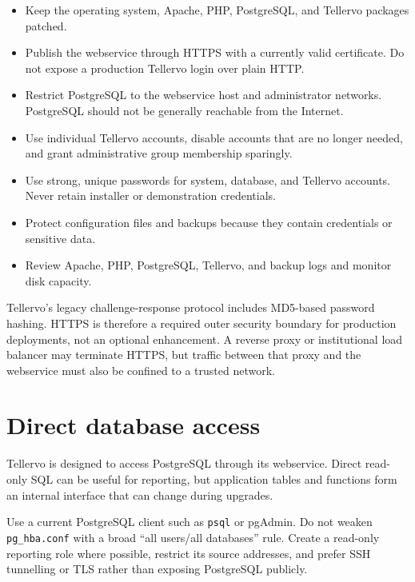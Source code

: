 \begin{itemize}
 \item Keep the operating system, Apache, PHP, PostgreSQL, and Tellervo packages
 patched.
 \item Publish the webservice through HTTPS with a currently valid certificate.
 Do not expose a production Tellervo login over plain HTTP.
 \item Restrict PostgreSQL to the webservice host and administrator networks.
 PostgreSQL should not be generally reachable from the Internet.
 \item Use individual Tellervo accounts, disable accounts that are no longer
 needed, and grant administrative group membership sparingly.
 \item Use strong, unique passwords for system, database, and Tellervo accounts.
 Never retain installer or demonstration credentials.
 \item Protect configuration files and backups because they contain credentials
 or sensitive data.
 \item Review Apache, PHP, PostgreSQL, Tellervo, and backup logs and monitor disk
 capacity.
\end{itemize}

Tellervo's legacy challenge-response protocol includes MD5-based password
hashing. HTTPS is therefore a required outer security boundary for production
deployments, not an optional enhancement. A reverse proxy or institutional load
balancer may terminate HTTPS, but traffic between that proxy and the
webservice must also be confined to a trusted network.

\section{Direct database access}

Tellervo is designed to access PostgreSQL through its webservice. Direct
read-only SQL can be useful for reporting, but application tables and functions
form an internal interface that can change during upgrades.


Use a current PostgreSQL client such as \verb|psql| or pgAdmin. Do not weaken
\verb|pg_hba.conf| with a broad ``all users/all databases'' rule. Create a
read-only reporting role where possible, restrict its source addresses, and
prefer SSH tunnelling or TLS rather than exposing PostgreSQL publicly.


